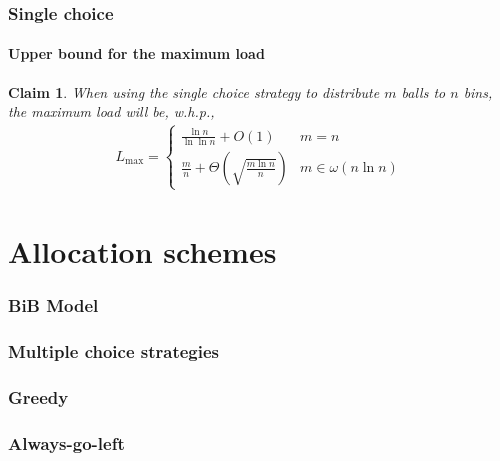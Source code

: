 \documentclass[serif,professionalfonts]{beamer}
\newcommand\load{L_{\mathrm{max}}}
\newtheorem{claim}{Claim}
\begin{document}
\begin{frame}
\frametitle{Single choice}
\framesubtitle{Upper bound for the maximum load}
\begin{claim}
When using the single choice strategy to distribute $m$ balls to $n$ bins, the maximum load will be, w.h.p.,
\begin{align}
\load = 
	\begin{cases}
    \frac{\ln n}{\ln\ln n} + O(1)              & m = n \\
    \frac{m}{n} + \Theta\left(\sqrt{\frac{m\ln n}{n}} \right)              & m \in \omega(n \ln n)
    \end{cases}
\end{align}
\end{claim}
\end{frame}

\begin{comment}
\begin{frame}
\frametitle{Applications}
\begin{itemize}
	\item Hashing
	\item Online load balancing
	\item Emulating PRAMs on DMMs
	\item Low congestion circuit routing
\end{itemize}
\end{frame}
\end{comment}


\section{Allocation schemes}
\begin{frame}
\frametitle{BiB Model}
\end{frame}

\begin{frame}
\frametitle{Multiple choice strategies}
\end{frame}

\begin{frame}
\frametitle{Greedy}
\end{frame}

\begin{frame}
\frametitle{Always-go-left}
\end{frame}
\end{document}
